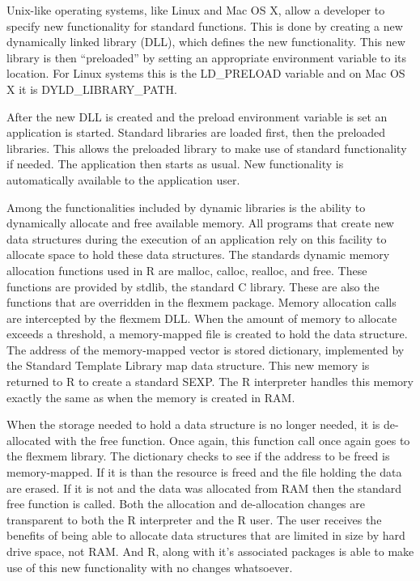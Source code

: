 Unix-like operating systems, like Linux and Mac OS X, allow a developer to 
specify new functionality for standard functions. This is done by creating
a new dynamically linked library (DLL), which defines the new functionality. 
This new library is then ``preloaded'' by setting an appropriate environment 
variable to its location. For Linux systems this is the LD\_PRELOAD variable
and on Mac OS X it is DYLD\_LIBRARY\_PATH. 

After the new DLL is created and the preload environment variable is set an 
application is started. Standard libraries are loaded first, then the preloaded
libraries. This allows the preloaded library to make use of standard 
functionality if needed. The application then starts as usual. New functionality
is automatically available to the application user.

Among the functionalities included by dynamic libraries is the ability
to dynamically allocate and free available memory. All programs that create
new data structures during the execution of an application rely on this facility
to allocate space to hold these data structures. The standards dynamic memory
allocation functions used in R are malloc, calloc, realloc, and free. These
functions are provided by stdlib, the standard C library. These are also
the functions that are overridden in the flexmem package. Memory allocation
calls are intercepted by the flexmem DLL. When the amount of memory to allocate
exceeds a threshold, a memory-mapped file is created to hold the data
structure. The address of the memory-mapped vector is stored dictionary, 
implemented by the Standard Template Library \citep{Plauger:STL} map data 
structure.  This new memory is returned to R to create a standard SEXP. 
The R interpreter handles this memory exactly the same as when the memory 
is created in RAM. 

When the storage needed to hold a data structure is no longer needed, it
is de-allocated with the free function. Once again, this function call
once again goes to the flexmem library. The dictionary checks to see if
the address to be freed is memory-mapped. If it is than the resource is
freed and the file holding the data are erased. If it is not and the 
data was allocated from RAM then the standard free function is called.
Both the allocation and de-allocation changes are transparent to both the 
R interpreter and the R user. The user receives the benefits of being able
to allocate data structures that are limited in size by hard drive space,
not RAM. And R, along with it's associated packages is able to make use
of this new functionality with no changes whatsoever.


